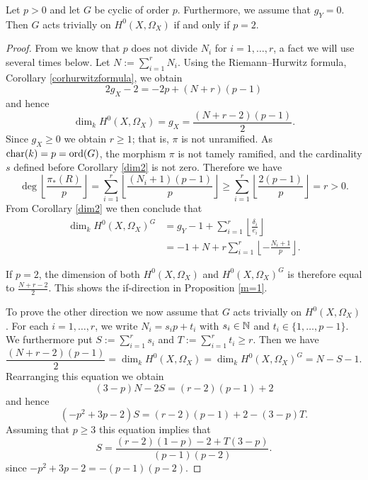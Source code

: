     \begin{prop}\label{m=1}
    Let $p  > 0$ and let $G$ be cyclic of order $p$.
    Furthermore, we assume that $g_Y=0$.
    Then $G$ acts trivially on $H^0(X,\Omega_X)$ if and only if $p=2$. 
    \end{prop}
    \begin{proof}
    From \cite[Lem.\ 1]{Naka} we know that $p$ does not divide $N_i$ for $i=1,\ldots ,r$, a fact we will use several times below. 
    Let $N:= \sum_{i=1}^r N_i$. 
    Using the Riemann--Hurwitz formula, Corollary \ref{corhurwitzformula}, we obtain
        \begin{equation}\label{hur2}
        2g_X - 2 = -2p + (N+r)(p-1)
        \end{equation}
    and hence
        \[
        \dim_kH^0(X,\Omega_X) = g_X =\frac{(N+r-2)(p-1)}{2}.
        \] 
    Since $g_X \ge 0$ we obtain $r \ge 1$; that is, $\pi$ is not unramified. 
    As $\operatorname{char}(k) = p = \operatorname{ord}(G)$, the morphism $\pi$ is not tamely ramified, and the cardinality $s$ defined before Corollary \ref{dim2} is not zero.
    Therefore we have 
        \[
        \deg \left\lfloor \frac{\pi_*(R)}{p} \right\rfloor =
        \sum_{i=1}^r \left\lfloor \frac{(N_i+1)(p-1)}{p}\right\rfloor 
        \ge \sum_{i=1}^r \left\lfloor \frac{2(p-1)}{p}\right\rfloor = r > 0.
        \] 
    From Corollary \ref{dim2} we then conclude that 
        \begin{align*}
        \dim_kH^0\left(X,\Omega_X\right)^G & =  g_Y - 1 + \sum_{i=1}^r\left\lfloor \frac{\delta_i}{e_i}\right\rfloor \\
        & =  -1 + N + r \sum_{i=1}^r\left\lfloor -\frac{N_i+1}{p}\right\rfloor.
        \end{align*}
    
    If $p=2$, the dimension of both $H^0(X,\Omega_X)$ and $H^0(X,\Omega_X)^G$ is therefore equal to $\frac{N+r-2}{2}$. 
    This shows the if-direction in Proposition \ref{m=1}.
    
    
    
    To prove the other direction we now assume that $G$ acts trivially on $H^0(X, \Omega_X)$.
    For each $i=1, \ldots, r$, we write $N_i = s_i p +t_i$ with $s_i \in {\mathbb N}$ and $t_i \in \{1, \ldots, p-1\}$. 
    We furthermore put $S:=\sum_{i=1}^r s_i$ and $T:= \sum_{i=1}^r t_i \ge r$. 
    Then we have
        \[ 
        \frac{(N+r-2)(p-1)}{2} =\dim_kH^0(X,\Omega_X)  = \dim_k H^0(X,\Omega_X)^G = N-S-1 .
        \]
    Rearranging this equation we obtain
        \[
        (3-p)N - 2S = (r-2)(p-1) +2  
        \]
    and hence
        \[
        (-p^2 + 3p -2)S = (r-2)(p-1) +2 - (3-p)T.
        \]
    Assuming that $p \ge 3$ this equation implies that
        \[ 
        S = \frac{(r-2)(1-p)-2 + T (3-p)}{(p-1)(p-2)}. 
        \]
    since $-p^2+3p-2 = - (p-1)(p-2)$. 
    

\end{proof}

